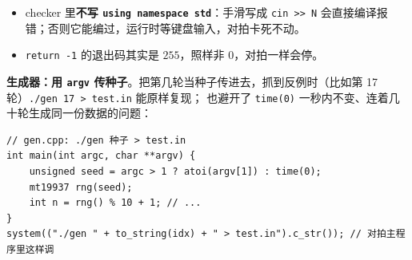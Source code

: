 	\begin{itemize}
		\item checker 里\textbf{不写 \texttt{using namespace std}}：手滑写成 \texttt{cin >> N} 会直接编译报错；否则它能编过，运行时等键盘输入，对拍卡死不动。
		\item \texttt{return -1} 的退出码其实是 $255$，照样非 $0$，对拍一样会停。
	\end{itemize}

	\textbf{生成器：用 \texttt{argv} 传种子}。把第几轮当种子传进去，抓到反例时（比如第 17 轮）\texttt{./gen 17 > test.in} 能原样复现；
	也避开了 \texttt{time(0)} 一秒内不变、连着几十轮生成同一份数据的问题：

	\begin{verbatim}
// gen.cpp: ./gen 种子 > test.in
int main(int argc, char **argv) {
	unsigned seed = argc > 1 ? atoi(argv[1]) : time(0);
	mt19937 rng(seed);
	int n = rng() % 10 + 1; // ...
}
system(("./gen " + to_string(idx) + " > test.in").c_str()); // 对拍主程序里这样调
	\end{verbatim}
